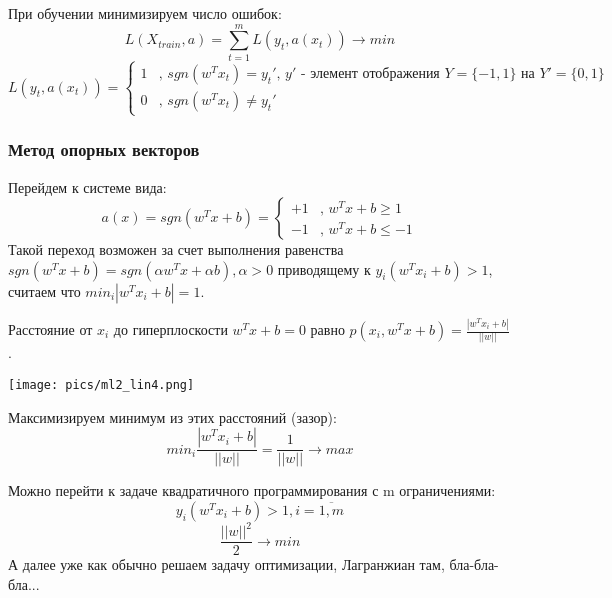 При обучении минимизируем число ошибок:
\begin{equation}
L(X_{train}, a) = \sum\limits_{t=1}^m L(y_t, a(x_t)) \rightarrow min
\end{equation}
\begin{equation*}
L(y_t, a(x_t)) = 
 \begin{cases}
   1 &\text{, $sgn(w^Tx_t) = y_t'$, $y'$ - элемент отображения $Y = \{-1, 1\}$ на $Y' = \{0, 1\}$}\\
   0 &\text{, $sgn(w^Tx_t) \ne y_t'$}
 \end{cases}
\end{equation*}

\subsubsection{Метод опорных векторов}
Перейдем к системе вида:
\begin{equation*}
a(x) = sgn(w^Tx + b) =  
 \begin{cases}
   +1 &\text{, $w^Tx + b \geq 1$}\\
   -1 &\text{, $w^Tx + b \leq -1$}
 \end{cases}
\end{equation*}
Такой переход возможен за счет выполнения равенства $sgn(w^Tx + b) = sgn(\alpha w^Tx + \alpha b), \alpha > 0$ приводящему к $y_i(w^Tx_i + b) > 1$, считаем что $min_i|w^Tx_i + b| = 1$.

Расстояние от $x_i$ до гиперплоскости $w^Tx + b = 0$ равно $p(x_i, w^Tx + b) = \frac{|w^Tx_i + b|}{||w||}$.

\texttt{[image: pics/ml2\_lin4.png]}

Максимизируем минимум из этих расстояний (зазор):
\begin{equation}
min_i\frac{|w^Tx_i + b|}{||w||} = \frac{1}{||w||} \rightarrow max
\end{equation}

Можно перейти к задаче квадратичного программирования с m ограничениями:
\begin{equation}
y_i(w^Tx_i + b) > 1, i=\overline{1,m}
\end{equation}
\begin{equation}
\frac{||w||^2}{2} \rightarrow min
\end{equation}
А далее уже как обычно решаем задачу оптимизации, Лагранжиан там, бла-бла-бла...

